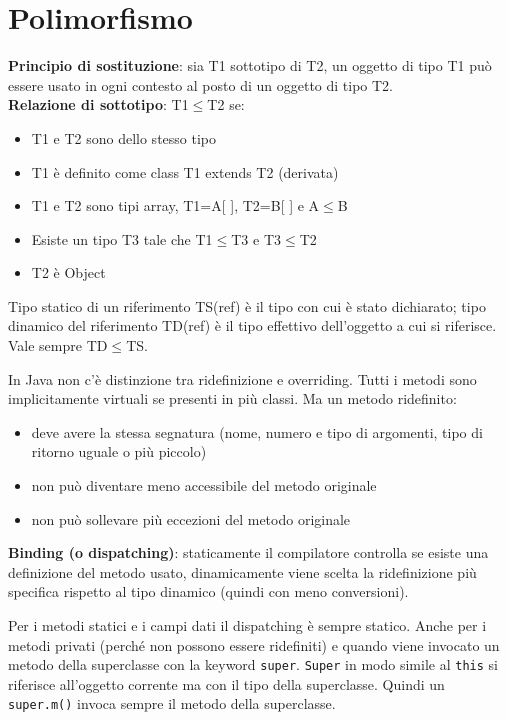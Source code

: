 \section{Polimorfismo} %

\textbf{Principio di sostituzione}: sia T1 sottotipo di T2, un oggetto di tipo T1 può essere usato in ogni contesto al posto di un oggetto di tipo T2. \\
\textbf{Relazione di sottotipo}: T1$\le$T2 se:
\begin{itemize}
\item T1 e T2 sono dello stesso tipo
\item T1 è definito come class T1 extends T2 (derivata)
\item T1 e T2 sono tipi array, T1=A[ ], T2=B[ ] e A$\le$B
\item Esiste un tipo T3 tale che T1$\le$T3 e T3$\le$T2
\item T2 è Object
\end{itemize}

Tipo statico di un riferimento TS(ref) è il tipo con cui è stato dichiarato; tipo dinamico del riferimento TD(ref) è il tipo effettivo dell'oggetto a cui si riferisce. Vale sempre TD$\le$TS.

In Java non c'è distinzione tra ridefinizione e overriding. Tutti i metodi sono implicitamente virtuali se presenti in più classi. Ma un metodo ridefinito:
\begin{itemize}
\item deve avere la stessa segnatura (nome, numero e tipo di argomenti, tipo di ritorno uguale o più piccolo)
\item non può diventare meno accessibile del metodo originale
\item non può sollevare più eccezioni del metodo originale
\end{itemize}
\textbf{Binding (o dispatching)}: staticamente il compilatore controlla se esiste una definizione del metodo usato, dinamicamente viene scelta la ridefinizione più specifica rispetto al tipo dinamico (quindi con meno conversioni).

Per i metodi statici e i campi dati il dispatching è sempre statico. Anche per i metodi privati (perché non possono essere ridefiniti) e quando viene invocato un metodo della superclasse con la keyword \texttt{super}. \texttt{Super} in modo simile al \texttt{this} si riferisce all'oggetto corrente ma con il tipo della superclasse. Quindi un \texttt{super.m()} invoca sempre il metodo della superclasse.

